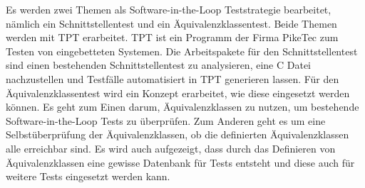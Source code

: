 Es werden zwei Themen als Software-in-the-Loop Teststrategie bearbeitet, nämlich ein Schnittstellentest und ein Äquivalenzklassentest.
Beide Themen werden mit TPT erarbeitet. TPT ist ein Programm der Firma PikeTec zum Testen von eingebetteten Systemen.
Die Arbeitspakete für den Schnittstellentest sind einen bestehenden Schnittstellentest zu analysieren, 
eine C Datei nachzustellen und Testfälle automatisiert in TPT generieren lassen.
Für den Äquivalenzklassentest wird ein Konzept erarbeitet, wie diese eingesetzt werden können.
Es geht zum Einen darum, Äquivalenzklassen zu nutzen, um bestehende Software-in-the-Loop Tests zu überprüfen.
Zum Anderen geht es um eine Selbstüberprüfung der Äquivalenzklassen, ob die definierten Äquivalenzklassen alle erreichbar sind.
Es wird auch aufgezeigt, dass durch das Definieren von Äquivalenzklassen eine gewisse Datenbank für Tests entsteht und 
diese auch für weitere Tests eingesetzt werden kann.


